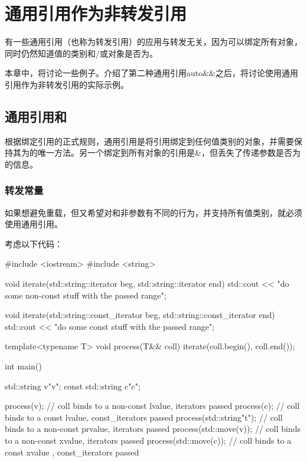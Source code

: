 \section{通用引用作为非转发引用}
有一些通用引用（也称为转发引用）的应用与转发无关，因为可以绑定所有对象，同时仍然知道值的类别和/或对象是否为。

本章中，将讨论一些例子。介绍了第二种通用引用auto\&\&之后，将讨论使用通用引用作为非转发引用的实际示例。

\subsection{通用引用和}

根据绑定引用的正式规则，通用引用是将引用绑定到任何值类别的对象，并需要保持其为的唯一方法。另一个绑定到所有对象的引用是\&，但丢失了传递参数是否为的信息。

\subsubsection{转发常量}

如果想避免重载，但又希望对和非参数有不同的行为，并支持所有值类别，就必须使用通用引用。

考虑以下代码：

\begin{cppcode}
#include <iostream>
#include <string>

void iterate(std::string::iterator beg, std::string::iterator end)
{
	std::cout << "do some non-const stuff with the passed range\n";
}

void iterate(std::string::const_iterator beg, std::string::const_iterator end)
{
	std::cout << "do some const stuff with the passed range\n";
}

template<typename T>
void process(T&& coll)
{
	iterate(coll.begin(), coll.end());
}

int main()
{
	std::string v{"v"};
	const std::string c{"c"};

	process(v); // coll binds to a non-const lvalue, iterators passed
	process(c); // coll binds to a const lvalue, const_iterators passed
	process(std::string{"t"}); // coll binds to a non-const prvalue, iterators passed
	process(std::move(v)); // coll binds to a non-const xvalue, iterators passed
	process(std::move(c)); // coll binds to a const xvalue , const_iterators passed
}
\end{cppcode}


